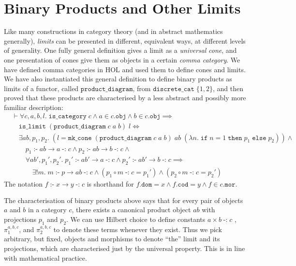 \documentclass[twoside,titlepage,11pt]{article}
\begin{document}
\section{Binary Products and Other Limits}%
\label{limits}
Like many constructions in category theory (and in abstract mathematics generally), \emph{limits} can be presented in different, equivalent ways, at different levels of generality.
One fully general definition gives a limit as a \emph{universal} \emph{cone}, and one presentation of cones give them as objects in a certain \emph{comma category}.
We have defined comma categories in HOL and used them to define cones and limits.
We have also instantiated this general definition to define binary products as limits of a functor, called $\mathtt{product\_diagram}$, from $\mathtt{discrete\_cat}\;\{1,2\}$, and then proved that these products are characterised by a less abstract and possibly more familiar description:
\begin{align*}
&\vdash\forall{c,a,b,l}.\;\mathtt{is\_category}\;c\land a\in c.\mathtt{obj}\land b \in c.\mathtt{obj}\implies\\
&\quad\mathtt{is\_limit}\;(\mathtt{product\_diagram}\;c\;a\;b)\;l\iff\\
&\quad\exists{ab,p_1,p_2}.\;(l = \mathtt{mk\_cone}\;(\mathtt{product\_diagram}\;c\;a\;b)\;ab\;(\lambda{n}.\; \mathtt{if}\;n = 1\;\mathtt{then}\;p_1\;\mathtt{else}\;p_2))\land{}\\
&\quad\quad p_1\operatorname{\mathtt{:-}}ab \to a\operatorname{\mathtt{-:}}c\land p_2\operatorname{\mathtt{:-}}ab \to b\operatorname{\mathtt{-:}}c\land{}\\
&\quad\quad\forall{ab',p_1',p_2'}.\;
p_1'\operatorname{\mathtt{:-}} ab' \to a \operatorname{\mathtt{-:}}c\land
p_2'\operatorname{\mathtt{:-}} ab' \to b \operatorname{\mathtt{-:}}c\implies\\
&\quad\quad\quad\exists!{m}.\;
m\operatorname{\mathtt{:-}}p\to ab\operatorname{\mathtt{-:}}c\land(p_1\circ m\operatorname{\mathtt{-:}}c = p_1')\land(p_2\circ m\operatorname{\mathtt{-:}}c = p_2')
\end{align*}
The notation $f\operatorname{\mathtt{:-}}x\to y\operatorname{\mathtt{-:}}c$ is shorthand for $f.\mathtt{dom}=x\land f.\mathtt{cod}=y\land f\in c.\mathtt{mor}$.

The characterisation of binary products above says that for every pair of objects $a$ and $b$ in a category $c$, there exists a canonical product object $ab$ with projections $p_1$ and $p_2$.
We can use Hilbert choice to define constants $a\times b\operatorname{\mathtt{-:}}c$ , $\pi_1^{a,b,c}$, and $\pi_2^{a,b,c}$ to denote these terms whenever they exist.
Thus we pick arbitrary, but fixed, objects and morphisms to denote ``the'' limit and its projections, which are characterised just by the universal property.
This is in line with mathematical practice.
\end{document}
